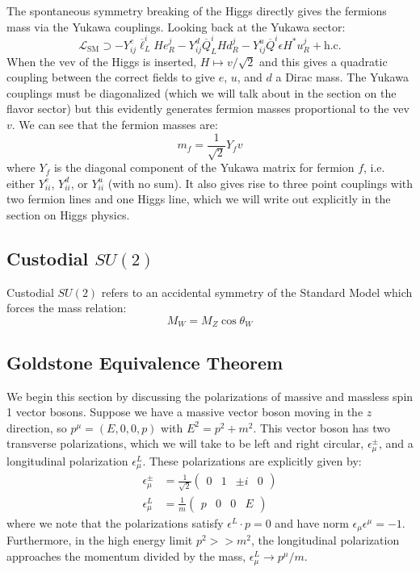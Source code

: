 \documentclass[11pt, oneside]{article}   	%
\theoremstyle{definition}
\numberwithin{equation}{subsection}		%
\begin{document}
The spontaneous symmetry breaking of the Higgs directly gives the fermions mass via the Yukawa couplings. Looking back at the Yukawa 
sector:
\begin{equation}
	\mathcal L_\mathrm{SM}\supset -Y_{ij}^e \overline \ell_L^{i} H e_R^j - Y_{ij}^d \overline Q_L^i H d_R^j - Y_{ij}^u \overline Q^i \epsilon
	H^* u_R^j + \mathrm{h.c.}
\end{equation}
When the vev of the Higgs is inserted, $H\mapsto v / \sqrt 2$ and this gives a quadratic coupling between the correct fields to give 
$e$, $u$, and $d$ a Dirac mass. The Yukawa couplings must be diagonalized (which we will talk about in the section on the flavor sector) 
but this evidently generates fermion masses proportional to the vev $v$. We can see that the fermion masses are:
\begin{equation}
	m_f = \frac{1}{\sqrt 2} Y_f v
\end{equation}
where $Y_f$ is the diagonal component of the Yukawa matrix for fermion $f$, i.e. either $Y_{ii}^e$, $Y_{ii}^d$, or $Y_{ii}^u$ (with no sum). 
It also gives rise to three point couplings with two fermion lines and one Higgs line, which we will write out explicitly in the section on Higgs physics. 

\subsection{Custodial $SU(2)$}

Custodial $SU(2)$ refers to an accidental symmetry of the Standard Model which forces the mass relation:
\begin{equation}
	M_W = M_Z\cos\theta_W
\end{equation}

\subsection{Goldstone Equivalence Theorem}

We begin this section by discussing the polarizations of massive and massless spin 1 vector bosons. Suppose we have a massive vector boson 
moving in the $z$ direction, so $p^\mu = (E, 0, 0, p)$ with $E^2 = p^2 + m^2$. This vector boson has two transverse polarizations, which 
we will take to be left and right circular, $\epsilon_\mu^\pm$, and a longitudinal polarization $\epsilon_\mu^L$. These polarizations are 
explicitly given by:
\begin{align}
	\epsilon_\mu^\pm &= \frac{1}{\sqrt 2} \begin{pmatrix} 0 & 1 & \pm i & 0 \end{pmatrix} \\
	\epsilon_\mu^L &= \frac{1}{m} \begin{pmatrix} p & 0 & 0 & E \end{pmatrix}
\end{align}
where we note that the polarizations satisfy $\epsilon^L\cdot p = 0$ and have norm $\epsilon_\mu \epsilon^\mu = -1$. Furthermore, 
in the high energy limit $p^2 >> m^2$, the longitudinal polarization approaches the momentum divided by the mass, $\epsilon_\mu^L
\rightarrow p^\mu / m$. 
\end{document}
